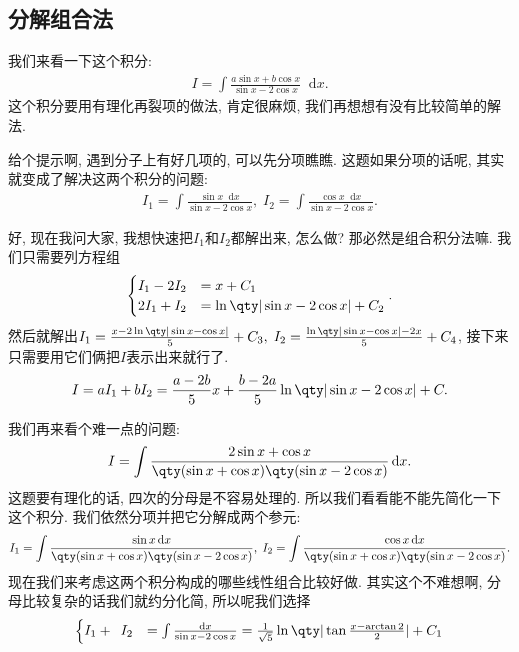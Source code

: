 \documentclass{ctexbook}
\newcommand*{\dif}{\mathop{}\!\mathrm{d}}
\begin{document}
{\subsection{分解组合法}
我们来看一下这个积分: 
\begin{align*}
I=\int\frac{a\sin{x}+b\cos{x}}{\sin{x}-2\cos{x}}\dif{x}
.\end{align*}
这个积分要用有理化再裂项的做法, 肯定很麻烦, 我们再想想有没有比较简单的解法. \par
给个提示啊, 遇到分子上有好几项的, 可以先分项瞧瞧. 这题如果分项的话呢, 其实就变成了解决这两个积分的问题: 
\begin{align*}
I_{1}=\int\frac{\sin{x}\dif{x}}{\sin{x}-2\cos{x}},\;I_{2}=\int\frac{\cos{x}\dif{x}}{\sin{x}-2\cos{x}}
.\end{align*}\par
好, 现在我问大家, 我想快速把$I_{1}$和$I_{2}$都解出来, 怎么做? 那必然是组合积分法嘛. 我们只需要列方程组
\begin{align*}
\begin{cases}
I_{1}-2I_{2}&=x+C_{1}\\
2I_{1}+I_{2}&=\ln\qty|\sin{x}-2\cos{x}|+C_{2}
\end{cases}
.\end{align*}
然后就解出$I_{1}=\frac{x-2\ln\qty|\sin{x}-\cos{x}|}{5}+C_{3},\;I_{2}=\frac{\ln\qty|\sin{x}-\cos{x}|-2x}{5}+C_{4}$, 接下来只需要用它们俩把$I$表示出来就行了. 
\begin{align*}
I=aI_{1}+bI_{2}=\frac{a-2b}{5}x+\frac{b-2a}{5}\ln\qty|\sin{x}-2\cos{x}|+C
.\end{align*}\par
我们再来看个难一点的问题: 
\begin{align*}
I=\int\frac{2\sin{x}+\cos{x}}{\qty(\sin{x}+\cos{x})\qty(\sin{x}-2\cos{x})}\dif{x}
.\end{align*}
这题要有理化的话, 四次的分母是不容易处理的. 所以我们看看能不能先简化一下这个积分. 我们依然分项并把它分解成两个参元: 
\begin{align*}
I_{1}=\int\frac{\sin{x}\dif{x}}{\qty(\sin{x}+\cos{x})\qty(\sin{x}-2\cos{x})},\;I_{2}=\int\frac{\cos{x}\dif{x}}{\qty(\sin{x}+\cos{x})\qty(\sin{x}-2\cos{x})}
.\end{align*}
现在我们来考虑这两个积分构成的哪些线性组合比较好做. 其实这个不难想啊, 分母比较复杂的话我们就约分化简, 所以呢我们选择
\begin{align*}
\begin{cases}
I_{1}+\;\:I_{2}&=\int\frac{\dif{x}}{\sin{x}-2\cos{x}}=\frac{1}{\sqrt{5}}\ln\qty|\tan{\frac{x-\arctan{2}}{2}}|+C_{1}\\

\end{cases}
\end{align*}}
\end{document}
